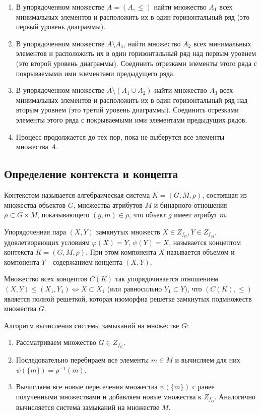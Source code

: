 \documentclass[bachelor, och, labwork]{shiza}
\begin{document}
        \begin{enumerate}
            \item В упорядоченном множестве $A = (A, \leq)$ найти множество $A_1$ всех минимальных элементов и расположить их в один горизонтальный ряд (это первый уровень диаграммы).
            \item В упорядоченном множестве $A \setminus A_1$, найти множество $A_2$ всех минимальных элементов и
            расположить их в один горизонтальный ряд над первым уровнем (это второй уровень диаграммы). Соединить
            отрезками элементы этого ряда с покрываемыми ими элементами предыдущего ряда.
            \item В упорядоченном множестве $A \setminus (A_1 \cup A_2)$ найти множество $A_3$ всех минимальных
            элементов и расположить их в один горизонтальный ряд над вторым уровнем (это третий уровень диаграммы).
            Соединить отрезками элементы этого ряда с покрываемыми ими элементами предыдущих рядов.
            \item Процесс продолжается до тех пор, пока не выберутся все элементы множества $A$.
        \end{enumerate}

    \subsection{Определение контекста и концепта}

        Контекстом называется алгебраическая система $K = (G, M, \rho)$, состоящая из множества объектов $G$, множества атрибутов $M$ и бинарного отношения $\rho \subset G \times M$, показывающего $(g, m) \in \rho$, что объект $g$ имеет атрибут $m$.

        Упорядоченная пара $(X, Y)$ замкнутых множеств $X \in Z_{f_G}, Y \in Z_{f_M}$, удовлетворяющих условиям $\varphi(X) = Y$, $\psi(Y) = X$, называется концептом контекста $K = (G, M, \rho)$. При этом компонента $X$ называется объемом и компонента $Y$ - содержанием концепта $(X, Y)$.

        Множество всех концептов $C(K)$ так упорядочивается отношением \\ $(X, Y) \leq (X_1, Y_1) \Leftrightarrow X \subset X_1$ (или равносильно $Y_1 \subset Y$), что $(C(K), \leq)$ является полной решеткой, которая изоморфна решетке замкнутых подмножеств множества $G$.

        Алгоритм вычисления системы замыканий на множестве $G$:
        \begin{enumerate}
            \item Рассматриваем множество $G \in Z_{f_G}$.
            \item Последовательно перебираем все элементы $m \in M$ и вычисляем для них $\psi(\{m\}) = \rho^{-1}(m)$.
            \item Вычисляем все новые пересечения множества $\psi(\{m\})$ с ранее полученными множествами и добавляем новые множества к $Z_{f_G}$. Аналогично вычисляется система замыканий на множестве $M$.
        \end{enumerate}
\end{document}
